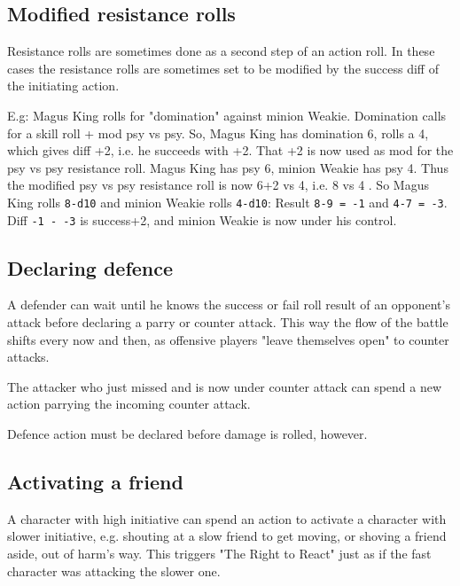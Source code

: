 \subsection*{Modified resistance rolls}
Resistance rolls are sometimes done as a second step of an action roll. In these cases the resistance rolls are sometimes set to be modified by the success diff of the initiating action.

E.g: Magus King rolls for "domination" against minion Weakie. Domination calls for a skill roll + mod psy vs psy. So, Magus King has domination 6, rolls a 4, which gives diff +2, i.e. he succeeds with +2. That +2 is now used as mod for the psy vs psy resistance roll. Magus King has psy 6, minion Weakie has psy 4. Thus the modified psy vs psy resistance roll is now 6+2 vs 4, i.e. 8 vs 4
. So Magus King rolls \verb|8-d10| and minion Weakie rolls \verb|4-d10|: Result \verb|8-9 = -1| and \verb|4-7 = -3|. Diff \verb|-1 - -3| is success+2, and minion Weakie is now under his control.



\subsection*{Declaring defence}
A defender can wait until he knows the success or fail roll result of an opponent's attack before declaring a parry or counter attack. This way the flow of the battle shifts every now and then, as offensive players "leave themselves open" to counter attacks.

The attacker who just missed and is now under counter attack can spend a new action parrying the incoming counter attack.

Defence action must be declared before damage is rolled, however.


\subsection*{Activating a friend}
A character with high initiative can spend an action to activate a character with slower initiative, e.g. shouting at a slow friend to get moving, or shoving a friend aside, out of harm's way. This triggers "The Right to React" just as if the fast character was attacking the slower one.


